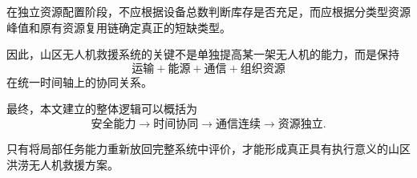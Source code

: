 \documentclass[UTF8,a4paper,12pt]{ctexart}
\begin{document}
在独立资源配置阶段，不应根据设备总数判断库存是否充足，而应根据分类型资源峰值和原有资源复用链确定真正的短缺类型。

因此，山区无人机救援系统的关键不是单独提高某一架无人机的能力，而是保持
\[
\boxed{
\text{运输}
+
\text{能源}
+
\text{通信}
+
\text{组织资源}
}
\]
在统一时间轴上的协同关系。

最终，本文建立的整体逻辑可以概括为
\[
\boxed{
\text{安全能力}
\rightarrow
\text{时间协同}
\rightarrow
\text{通信连续}
\rightarrow
\text{资源独立}
}.
\]

只有将局部任务能力重新放回完整系统中评价，才能形成真正具有执行意义的山区洪涝无人机救援方案。


\clearpage
\renewcommand{\refname}{参考文献}



\clearpage
\appendix

\end{document}
